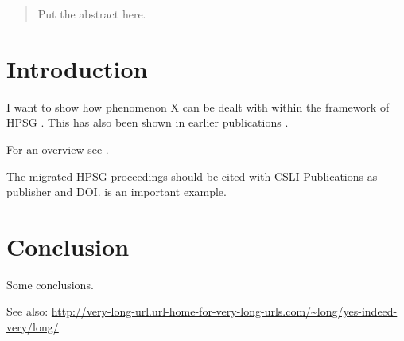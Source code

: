 \documentclass[11pt,a4paper,fleqn,draft]{article}
\let\citew\citet
\begin{document}

\begin{abstract}
Put the abstract here.
\end{abstract}

\setcounter{footnote}{2}
\renewcommand{\thefootnote}{\fnsymbol{footnote}}
\renewcommand{\thefootnote}{\arabic{footnote}}
\setcounter{footnote}{0}


\section{Introduction}

I want to show how phenomenon X can be dealt with within the framework of HPSG
\citep{PS87a,PS94a}. This has also been shown in earlier publications
\parencites[145]{PS87a}[256]{PS94a}.

For an overview see \citew{BC2021a}.

The migrated HPSG proceedings should be cited with CSLI Publications as publisher and
DOI. \citet{Sag2007a} is an important example.

\section{Conclusion}

Some conclusions.


See also: \url{http://very-long-url.url-home-for-very-long-urls.com/~long/yes-indeed-very/long/}



{\sloppy
\printbibliography[heading=subbibliography,notkeyword=this] 
}
\end{document}
